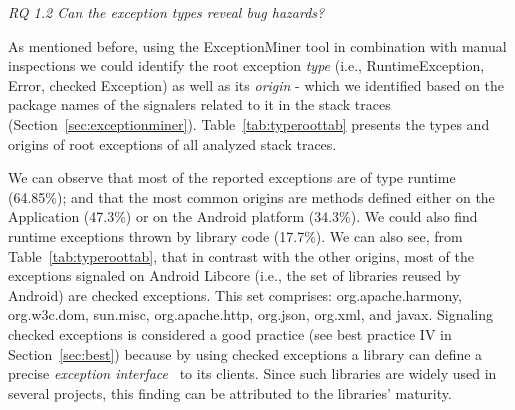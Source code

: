 
\bigskip 


\bigskip 

\noindent\emph{RQ 1.2 Can the exception types reveal bug hazards?}

\bigskip

As mentioned before, using the ExceptionMiner tool in combination with manual inspections we could identify
the root exception \emph{type} (i.e., RuntimeException, Error, checked Exception) as well as its \emph{origin} - which we 
identified based on the package names of the signalers related to it in the stack traces (Section~\ref{sec:exceptionminer}).
Table~\ref{tab:typeroottab} presents the types and origins of root exceptions of all analyzed stack traces. 

We can observe that most of the reported exceptions are of type runtime 
(64.85\%); and that the most common origins are methods defined either on the Application (47.3\%)
or on the Android platform (34.3\%). We could also find runtime exceptions thrown by library code (17.7\%).
 We can also see, from Table~\ref{tab:typeroottab}, that in contrast with the other origins, most of the 
 exceptions signaled on Android Libcore (i.e., the set of libraries reused by Android) are 
checked exceptions. This set comprises: org.apache.harmony, org.w3c.dom, sun.misc, 
org.apache.http, org.json, org.xml, and javax. Signaling checked exceptions is considered a 
good practice (see best practice IV in Section~\ref{sec:best}) because by using 
checked exceptions a library can define a precise 
\emph{exception interface}~\cite{miller1997issues} to its clients.
 Since such libraries are widely used  in several projects, this
 finding can be attributed to the libraries' maturity.

